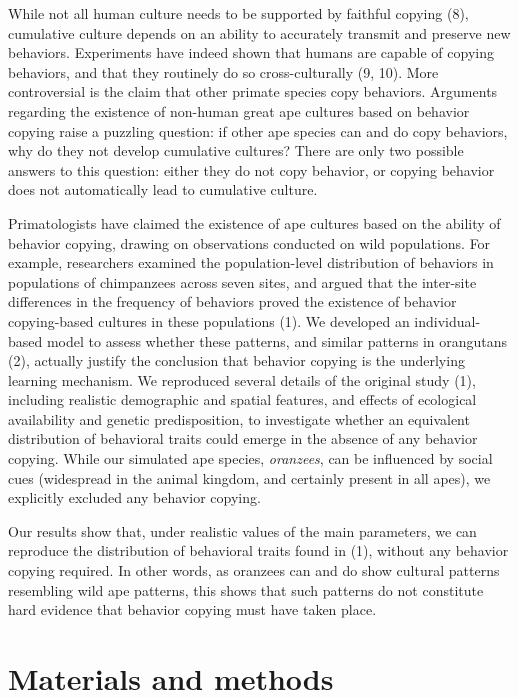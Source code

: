 \documentclass[9pt,twocolumn,twoside,]{pnas-new}
\begin{document}
While not all human culture needs to be supported by faithful copying
(8), cumulative culture depends on an ability to accurately transmit and
preserve new behaviors. Experiments have indeed shown that humans are
capable of copying behaviors, and that they routinely do so
cross-culturally (9, 10). More controversial is the claim that other
primate species copy behaviors. Arguments regarding the existence of
non-human great ape cultures based on behavior copying raise a puzzling
question: if other ape species can and do copy behaviors, why do they
not develop cumulative cultures? There are only two possible answers to
this question: either they do not copy behavior, or copying behavior
does not automatically lead to cumulative culture.

Primatologists have claimed the existence of ape cultures based on the
ability of behavior copying, drawing on observations conducted on wild
populations. For example, researchers examined the population-level
distribution of behaviors in populations of chimpanzees across seven
sites, and argued that the inter-site differences in the frequency of
behaviors proved the existence of behavior copying-based cultures in
these populations (1). We developed an individual-based model to assess
whether these patterns, and similar patterns in orangutans (2), actually
justify the conclusion that behavior copying is the underlying learning
mechanism. We reproduced several details of the original study (1),
including realistic demographic and spatial features, and effects of
ecological availability and genetic predisposition, to investigate
whether an equivalent distribution of behavioral traits could emerge in
the absence of any behavior copying. While our simulated ape species,
\emph{oranzees}, can be influenced by social cues (widespread in the
animal kingdom, and certainly present in all apes), we explicitly
excluded any behavior copying.

Our results show that, under realistic values of the main parameters, we
can reproduce the distribution of behavioral traits found in (1),
without any behavior copying required. In other words, as oranzees can
and do show cultural patterns resembling wild ape patterns, this shows
that such patterns do not constitute hard evidence that behavior copying
must have taken place.

\section*{Materials and methods}\label{materials-and-methods}
\end{document}
